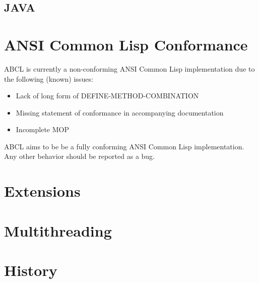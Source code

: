 \documentclass[10pt]{article}
\begin{document}
\subsection{JAVA}


\section{ANSI Common Lisp Conformance}

ABCL is currently a non-conforming ANSI Common Lisp implementation due
to the following (known) issues:

\begin{itemize}
  \item Lack of long form of DEFINE-METHOD-COMBINATION
  \item Missing statement of conformance in accompanying documentation
  \item Incomplete MOP 
\end{itemize}

ABCL aims to be be a fully conforming ANSI Common Lisp
implementation.  Any other behavior should be reported as a bug.

\section{Extensions}


\section{Multithreading}


\section{History}
\end{document}
